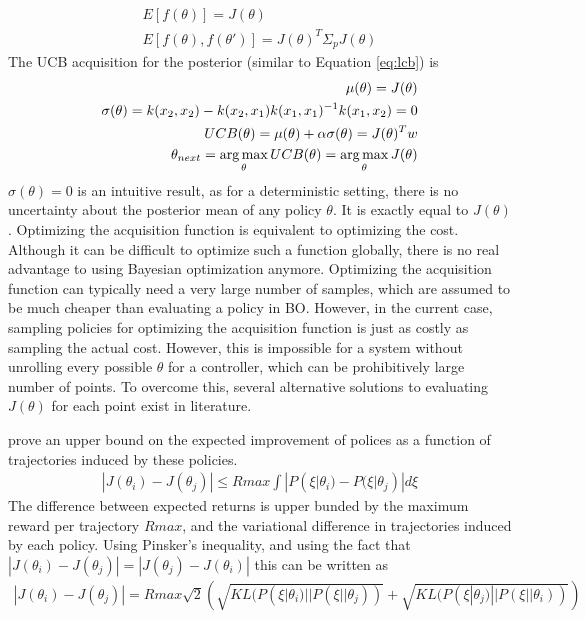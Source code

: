 \begin{align}
    E[f(\theta)] = J(\theta)\\
    E[f(\theta),f(\theta')] = J(\theta)^T \Sigma_p J(\theta)
\end{align}
The UCB acquisition for the posterior (similar to Equation \ref{eq:lcb}) is
\begin{align*}
    \mu(\theta) = J(\theta)\\
    \sigma(\theta) = k(x_2,x_2)-k(x_2,x_1)k(x_1,x_1)^{-1} k(x_1,x_2) = 0 \\
    UCB(\theta) = \mu(\theta) + \alpha \sigma(\theta) = J(\theta)^Tw \\
    \theta_{next} = \operatorname*{arg\,max}_{\theta} UCB(\theta) = \operatorname*{arg\,max}_{\theta} J(\theta)
\end{align*}
$\sigma(\theta) = 0$ is an intuitive result, as for a deterministic setting, there is no uncertainty about the posterior mean of any policy $\theta$. It is exactly equal to $J(\theta)$. Optimizing the acquisition function is equivalent to optimizing the cost. Although it can be difficult to optimize such a function globally, there is no real advantage to using Bayesian optimization anymore. Optimizing the acquisition function can typically need a very large number of samples, which are assumed to be much cheaper than evaluating a policy in BO. However, in the current case, sampling policies for optimizing the acquisition function is just as costly as sampling the actual cost. 
However, this is impossible for a system without unrolling every possible $\theta$ for a controller, which can be prohibitively large number of points. To overcome this, several alternative solutions to evaluating $J(\theta)$ for each point exist in literature.

\cite{wilson2014using} prove an upper bound on the expected improvement of polices as a function of trajectories induced by these policies. 
\begin{align}
   |J(\theta_i) - J(\theta_j)|  \leq  Rmax \int | P(\xi | \theta_i) - P(\xi | \theta_j)| d\xi
\end{align}
The difference between expected returns is upper bunded by the maximum reward per trajectory $Rmax$, and the variational difference in trajectories induced by each policy. Using Pinsker's inequality, and using the fact that $|J(\theta_i) - J(\theta_j)| = |J(\theta_j) - J(\theta_i)|$  this can be written as
\begin{align}
    |J(\theta_i) - J(\theta_j)| = Rmax \sqrt{2} (\sqrt{KL(P(\xi|\theta_i)||P(\xi || \theta_j))} + \sqrt{KL(P(\xi|\theta_j)||P(\xi || \theta_i))} )
\end{align}

